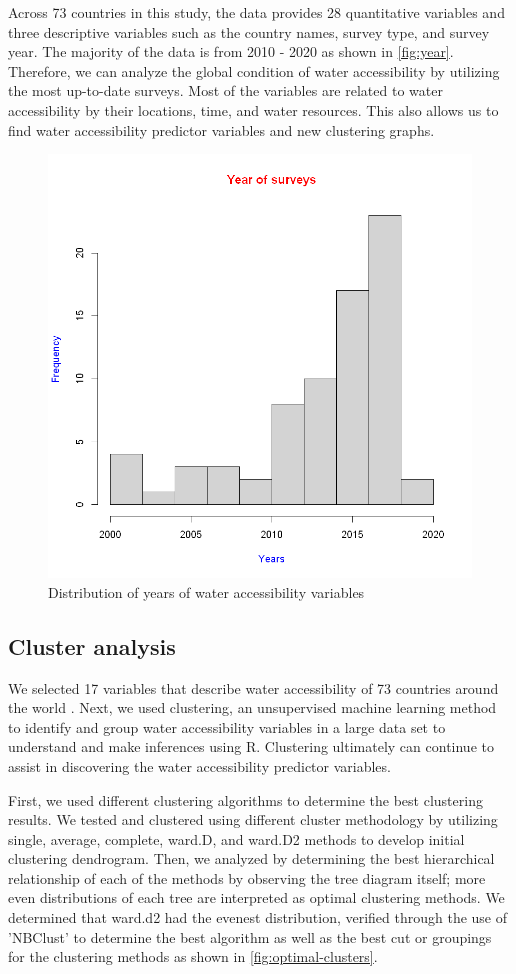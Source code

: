 \documentclass[10pt,twoside]{article}
\numberwithin{equation}{section}
\newcommand{\?}{\stackrel{?}{=}}
\begin{document}
Across 73 countries in this study, the data provides 28 quantitative variables and three descriptive variables such as the country names, survey type, and survey year. The majority of the data is from 2010 - 2020 as shown in \autoref{fig:year}. Therefore, we can analyze the global condition of water accessibility by utilizing the most up-to-date surveys. Most of the variables are related to water accessibility by their locations, time, and water resources. This also allows us to find water accessibility predictor variables and new clustering graphs. 

\begin{figure}[h!]
  \centering
  \includegraphics[width=.7\textwidth]{year}
  \caption{Distribution of years of water accessibility variables}
  \label{fig:year}
\end{figure}


\subsection{Cluster analysis}
We selected 17 variables that describe water accessibility of 73 countries around the world \citep{price2019difference}. Next, we used clustering, an unsupervised machine learning method to identify and group water accessibility variables in a large data set to understand and make inferences using R. Clustering ultimately can continue to assist in discovering the water accessibility predictor variables. 

First, we used different clustering algorithms to determine the best clustering results. We tested and clustered using different cluster methodology by utilizing single, average, complete, ward.D, and ward.D2 methods to develop initial clustering dendrogram. Then, we analyzed by determining the best hierarchical relationship of each of the methods by observing the tree diagram itself; more even distributions of each tree are interpreted as optimal clustering methods. We determined that ward.d2 had the evenest distribution, verified through the use of 'NBClust' to determine the best algorithm as well as the best cut or groupings for the clustering methods as shown in \autoref{fig:optimal-clusters}. 
\end{document}
